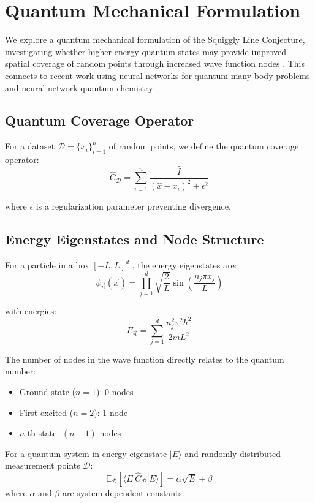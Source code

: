 \section{Quantum Mechanical Formulation}
\label{sec:quantum_theory}

We explore a quantum mechanical formulation of the Squiggly Line Conjecture, investigating whether higher energy quantum states may provide improved spatial coverage of random points through increased wave function nodes \cite{Dirac1982PrinciplesOQ}. This connects to recent work using neural networks for quantum many-body problems \cite{Carleo2017NeuralQuantum, InfiniteNeuralQuantum2023} and neural network quantum chemistry \cite{NeuralQuantumChemistry}.

\subsection{Quantum Coverage Operator}

For a dataset $\mathcal{D} = \{x_i\}_{i=1}^n$ of random points, we define the quantum coverage operator:
$$\hat{C}_\mathcal{D} = \sum_{i=1}^n \frac{\hat{I}}{(\hat{x} - x_i)^2 + \epsilon^2}$$

where $\epsilon$ is a regularization parameter preventing divergence.

\subsection{Energy Eigenstates and Node Structure}

For a particle in a box $[-L, L]^d$ \cite{Sakurai1986ModernQM}, the energy eigenstates are:
$$\psi_{\vec{n}}(\vec{x}) = \prod_{j=1}^d \sqrt{\frac{2}{L}} \sin\left(\frac{n_j \pi x_j}{L}\right)$$

with energies:
$$E_{\vec{n}} = \sum_{j=1}^d \frac{n_j^2 \pi^2 \hbar^2}{2mL^2}$$

The number of nodes in the wave function directly relates to the quantum number:
\begin{itemize}
    \item Ground state ($n=1$): 0 nodes
    \item First excited ($n=2$): 1 node  
    \item $n$-th state: $(n-1)$ nodes
\end{itemize}

\begin{theorem}
For a quantum system in energy eigenstate $|E\rangle$ and randomly distributed measurement points $\mathcal{D}$:
$$\mathbb{E}_\mathcal{D}[\langle E | \hat{C}_\mathcal{D} | E \rangle] = \alpha \sqrt{E} + \beta$$
where $\alpha$ and $\beta$ are system-dependent constants.
\end{theorem}


